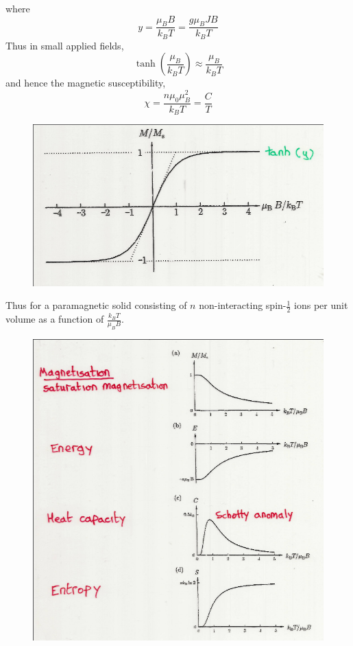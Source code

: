 \documentclass[a4paper, 11pt, normalem]{report}
\begin{document}
where
\begin{equation}
    y = \frac{\mu_BB}{k_BT} = \frac{g\mu_BJB}{k_BT}
\end{equation}
Thus in small applied fields, 
\begin{equation}
    \tanh\left(\frac{\mu_B}{k_BT}\right) \approx \frac{\mu_B}{k_BT}
\end{equation}
and hence the magnetic susceptibility,
\begin{equation}
    \chi = \frac{n\mu_0\mu_B^2}{k_BT} = \frac{C}{T}
\end{equation}
\begin{figure}[H]
    \centering
    \includegraphics[scale=0.5]{tanh.png}
\end{figure}
Thus for a paramagnetic solid consisting of $n$ non-interacting spin-$\frac12$ ions per unit volume as a function of $\frac{k_BT}{\mu_BB}$.
\begin{figure}[H]
    \centering
    \includegraphics[scale=0.5]{func.png}
\end{figure}
\end{document}
